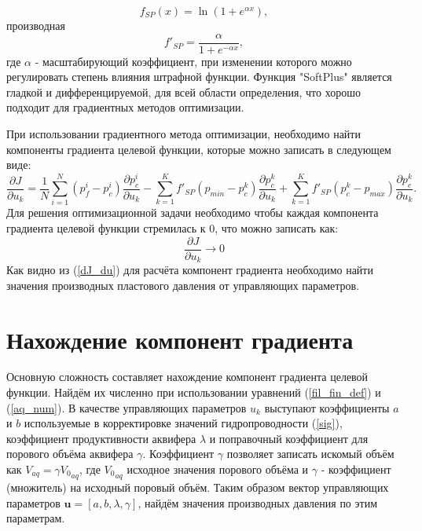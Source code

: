 \documentclass[14pt]{article}
\begin{document}
\begin{equation} \label{SP}
f_{SP}(x) = \ln\left(1+e^{\alpha x}\right),
\end{equation}
производная 
\begin{equation} \label{dSP}
f'_{SP} = \frac{\alpha}{1+e^{-\alpha x}},
\end{equation}
где $ \alpha $ - масштабирующий коэффициент, при изменении которого можно регулировать степень влияния штрафной функции. Функция "SoftPlus" является гладкой и дифференцируемой, для всей области определения, что хорошо подходит для градиентных методов оптимизации. 

При использовании градиентного метода оптимизации, необходимо найти компоненты градиента целевой функции, которые можно записать в следующем виде:
\begin{equation}\label{dJ_du}
	\frac{\partial J}{\partial u_k} = \frac{1}{N}\sum_{i=1}^N \left(p_f^i-p_c^i\right)\frac{\partial p_c^i}{\partial u_k} - \sum_{k=1}^K{f'_{SP}(p_{min} - p^k_c)\frac{\partial p_c^k}{\partial u_k}} + \sum_{k=1}^K{f'_{SP}(p^k_c-p_{max})\frac{\partial p_c^k}{\partial u_k}}.
\end{equation}
Для решения оптимизационной задачи необходимо чтобы каждая компонента градиента целевой функции стремилась к 0, что можно записать как:
\begin{equation} \label{dJ_du0}
\frac{\partial J}{\partial u_k} \rightarrow 0
\end{equation}
Как видно из (\ref{dJ_du}) для расчёта компонент градиента необходимо найти значения производных пластового давления от управляющих параметров.

\section{Нахождение компонент градиента}
Основную сложность составляет нахождение компонент градиента целевой функции. Найдём их численно при использовании уравнений (\ref{fil_fin_def}) и (\ref{aq_num}). В качестве управляющих параметров $ u_k $ выступают коэффициенты $ a $ и $ b $ используемые в корректировке значений гидропроводности   (\ref{sig}), коэффициент продуктивности аквифера $ \lambda $ и поправочный коэффициент для порового объёма аквифера $ \gamma $. Коэффициент $ \gamma $ позволяет записать искомый объём как $ V_{aq} = \gamma{V_0}_{aq}$, где $ {V_0}_{aq} $ исходное значения порового объёма и $ \gamma $ - коэффициент (множитель) на исходный поровый объём. Таким образом вектор управляющих параметров $ \boldsymbol{u} = [a,b,\lambda,\gamma]$, найдём значения производных давления по этим параметрам.
\end{document}
